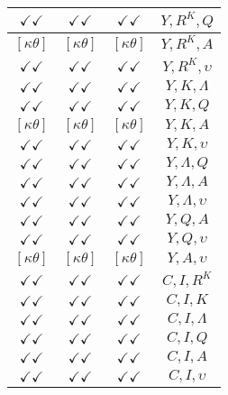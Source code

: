 \documentclass[a4paper,10pt]{article}
\begin{document}
\begin{longtable}{|c|c|c|c|}
\hline
$\checkmark\checkmark$ & $\checkmark\checkmark$ & $\checkmark\checkmark$ & ${Y},{R^{K}},{Q}$ \\
\hline
$[\kappa \theta ]$ & $[\kappa \theta ]$ & $[\kappa \theta ]$ & ${Y},{R^{K}},{A}$ \\
\hline
$\checkmark\checkmark$ & $\checkmark\checkmark$ & $\checkmark\checkmark$ & ${Y},{R^{K}},{\upsilon}$ \\
\hline
$\checkmark\checkmark$ & $\checkmark\checkmark$ & $\checkmark\checkmark$ & ${Y},{K},{\Lambda}$ \\
\hline
$\checkmark\checkmark$ & $\checkmark\checkmark$ & $\checkmark\checkmark$ & ${Y},{K},{Q}$ \\
\hline
$[\kappa \theta ]$ & $[\kappa \theta ]$ & $[\kappa \theta ]$ & ${Y},{K},{A}$ \\
\hline
$\checkmark\checkmark$ & $\checkmark\checkmark$ & $\checkmark\checkmark$ & ${Y},{K},{\upsilon}$ \\
\hline
$\checkmark\checkmark$ & $\checkmark\checkmark$ & $\checkmark\checkmark$ & ${Y},{\Lambda},{Q}$ \\
\hline
$\checkmark\checkmark$ & $\checkmark\checkmark$ & $\checkmark\checkmark$ & ${Y},{\Lambda},{A}$ \\
\hline
$\checkmark\checkmark$ & $\checkmark\checkmark$ & $\checkmark\checkmark$ & ${Y},{\Lambda},{\upsilon}$ \\
\hline
$\checkmark\checkmark$ & $\checkmark\checkmark$ & $\checkmark\checkmark$ & ${Y},{Q},{A}$ \\
\hline
$\checkmark\checkmark$ & $\checkmark\checkmark$ & $\checkmark\checkmark$ & ${Y},{Q},{\upsilon}$ \\
\hline
$[\kappa \theta ]$ & $[\kappa \theta ]$ & $[\kappa \theta ]$ & ${Y},{A},{\upsilon}$ \\
\hline
$\checkmark\checkmark$ & $\checkmark\checkmark$ & $\checkmark\checkmark$ & ${C},{I},{R^{K}}$ \\
\hline
$\checkmark\checkmark$ & $\checkmark\checkmark$ & $\checkmark\checkmark$ & ${C},{I},{K}$ \\
\hline
$\checkmark\checkmark$ & $\checkmark\checkmark$ & $\checkmark\checkmark$ & ${C},{I},{\Lambda}$ \\
\hline
$\checkmark\checkmark$ & $\checkmark\checkmark$ & $\checkmark\checkmark$ & ${C},{I},{Q}$ \\
\hline
$\checkmark\checkmark$ & $\checkmark\checkmark$ & $\checkmark\checkmark$ & ${C},{I},{A}$ \\
\hline
$\checkmark\checkmark$ & $\checkmark\checkmark$ & $\checkmark\checkmark$ & ${C},{I},{\upsilon}$ \\

\end{longtable}
\end{document}
